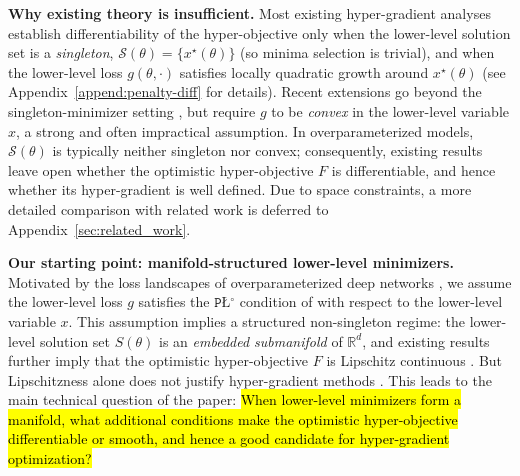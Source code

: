 \documentclass{article}
\newcommand{\grayhl}[1]{\hl{#1}}
\theoremstyle{normaltheorem}
\newcommand{\PLcirc}{\texttt{P\L$^\circ$}}
\newcommand{\calS}{\mathcal{S}}
\begin{document}
\textbf{Why existing theory is insufficient.} Most existing hyper-gradient analyses establish differentiability of the hyper-objective only when the lower-level solution set is a \emph{singleton}, \(\calS(\theta)=\{x^\star(\theta)\}\) (so minima selection is trivial), and when the lower-level loss \(g(\theta,\cdot)\) satisfies {locally quadratic growth} around \(x^\star(\theta)\) \citep{pedregosa2016hypergrad,franceschi2017forward,lorraine2020optimizing,huang2024optimal,liu2022bome,kwon2023penalty} (see Appendix~\ref{append:penalty-diff} for details). Recent extensions go beyond the singleton-minimizer setting \citep{xiao2023generalized,shen2025penalty}, but require \(g\) to be \emph{convex} in the lower-level variable \(x\), a strong and often impractical assumption. In overparameterized models, \(\calS(\theta)\) is typically neither singleton nor convex; consequently, existing results leave open whether the optimistic hyper-objective \(F\) is differentiable, and hence whether its hyper-gradient is well defined. Due to space constraints, a more detailed comparison with related work is deferred to Appendix~\ref{sec:related_work}.








\textbf{Our starting point: manifold-structured lower-level minimizers.} 
Motivated by the loss landscapes of overparameterized deep networks \citep{venturi2018spurious,liu2022loss}, we assume  the lower-level loss \(g\) satisfies the \(\PLcirc\) condition of \citep{gong2024poincare} with respect to the lower-level variable \(x\). This assumption implies a structured non-singleton regime: the lower-level solution set \(S(\theta)\) is an \emph{embedded submanifold} of \(\mathbb{R}^d\), and existing results further imply that the optimistic hyper-objective \(F\) is Lipschitz continuous \citep{masiha2025superquantile}. But Lipschitzness alone does not justify hyper-gradient methods \citep{chen2023bilevel}.
This leads to the main technical question of the paper: \grayhl{When lower-level minimizers form a manifold, what additional conditions make the optimistic hyper-objective differentiable or smooth, and hence a good candidate for hyper-gradient optimization?}
\end{document}
